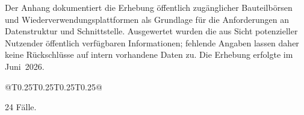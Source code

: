 \label{anlage:bauteilboersen}

Der Anhang dokumentiert die Erhebung öffentlich zugänglicher Bauteilbörsen und Wiederverwendungsplattformen als Grundlage für die Anforderungen an Datenstruktur und Schnittstelle. Ausgewertet wurden die aus Sicht potenzieller Nutzender öffentlich verfügbaren Informationen; fehlende Angaben lassen daher keine Rückschlüsse auf intern vorhandene Daten zu. Die Erhebung erfolgte im Juni~2026.

\begin{Table}[title=Überblick]
\begin{SemioTable}{@{}T{0.25\tabcolsep}T{0.25\tabcolsep}T{0.25\tabcolsep}T{0.25\tabcolsep}@{}}
\end{SemioTable}
\end{Table}


24 Fälle.

